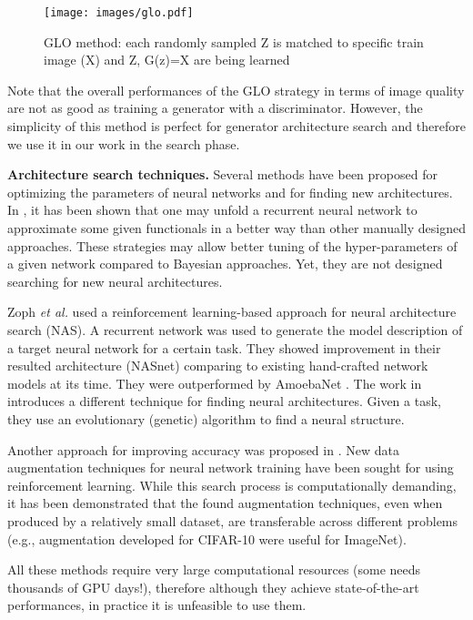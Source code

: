 \documentclass[10pt,twocolumn,letterpaper]{article}
\begin{document}
\begin{figure}  
    \centering
        \texttt{[image: images/glo.pdf]}
        \caption{GLO method: each randomly sampled Z is matched to specific train image (X) and Z, G(z)=X are being learned}
        \label{fig:GLO}
    \end{figure}
    
Note that the overall performances of the GLO strategy in terms of image quality are not as good as training a generator
with a discriminator. However, the simplicity of this method is perfect for generator architecture search and therefore we use it in our work in the search phase. 

{\bf Architecture search techniques.} Several methods have been proposed for optimizing the parameters of neural networks and for finding new architectures. 
In \cite{Andrychowicz16Learning,Chen17Learning}, it has been shown that one may unfold a recurrent neural network to approximate some given functionals in a better way than other manually designed approaches. These strategies may allow better tuning of the hyper-parameters of a given network compared to Bayesian approaches.
Yet, they are not designed searching for new neural architectures. 

Zoph \emph{et al.} \cite{zophNasRL} used a reinforcement learning-based approach for neural architecture search (NAS). A recurrent network was used to generate the model description of a target neural network for a certain task. They showed improvement in their resulted architecture (NASnet) comparing to existing hand-crafted network models at its time. They were outperformed by AmoebaNet \cite{Real18Regularized}.  The work in \cite{Real17Large,Real18Regularized} introduces a different technique for finding neural architectures. Given a task, they use an evolutionary (genetic) algorithm to find a neural structure.  

Another approach for improving accuracy was proposed in \cite{AutoAug}. New data augmentation techniques for neural network training have been sought for using reinforcement learning. While this search process is computationally demanding, it has been demonstrated that the found augmentation techniques, even when produced by a relatively small dataset, are transferable across different problems (e.g., augmentation developed for CIFAR-10 were useful for ImageNet). 

All these methods require very large computational resources (some needs thousands of GPU days!),
therefore although they achieve state-of-the-art performances, in practice it is unfeasible to use them.
\end{document}

